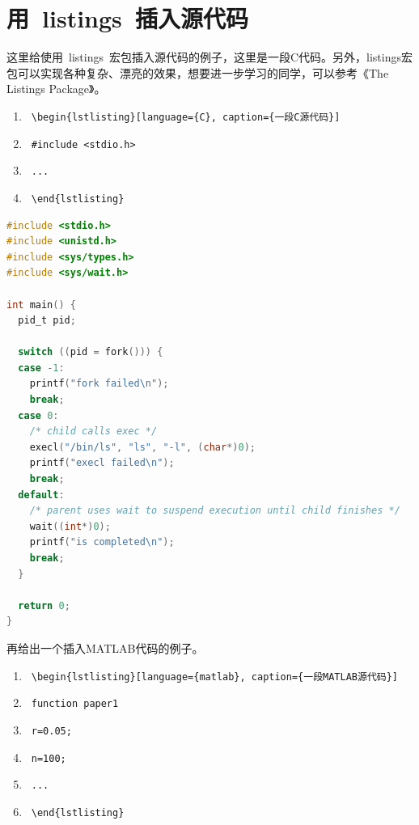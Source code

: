 \section{用~listings~插入源代码}

这里给使用~listings~宏包插入源代码的例子，这里是一段C代码。另外，listings宏包可以实现各种复杂、漂亮的效果，想要进一步学习的同学，可以参考《The Listings Package》。

{\color{blue}
\begin{enumerate}
\item[] ~\verb|\begin{lstlisting}[language={C}, caption={一段C源代码}]|
\item[] ~\verb|#include <stdio.h>| 
\item[] ~\verb|...|
\item[] ~\verb|\end{lstlisting}|
\end{enumerate}}


\begin{lstlisting}[language={C}, caption={一段C源代码}]
#include <stdio.h>
#include <unistd.h>
#include <sys/types.h>
#include <sys/wait.h>

int main() {
  pid_t pid;

  switch ((pid = fork())) {
  case -1:
    printf("fork failed\n");
    break;
  case 0:
    /* child calls exec */
    execl("/bin/ls", "ls", "-l", (char*)0);
    printf("execl failed\n");
    break;
  default:
    /* parent uses wait to suspend execution until child finishes */
    wait((int*)0);
    printf("is completed\n");
    break;
  }

  return 0;
}
\end{lstlisting}

再给出一个插入MATLAB代码的例子。

{\color{blue}
\begin{enumerate}
\item[] ~\verb|\begin{lstlisting}[language={matlab}, caption={一段MATLAB源代码}]|
\item[] ~\verb|function paper1| 
\item[] ~\verb|r=0.05;|
\item[] ~\verb|n=100;|
\item[] ~\verb|...|
\item[] ~\verb|\end{lstlisting}|
\end{enumerate}}

